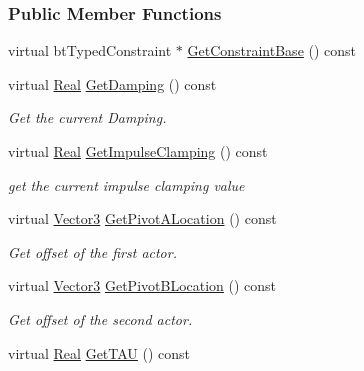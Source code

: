 \subsubsection*{Public Member Functions}
\begin{DoxyCompactItemize}
\item 
virtual btTypedConstraint $\ast$ \hyperlink{classMezzanine_1_1Point2PointConstraint_a99f25e594a55a5c84db10981c30ffd60}{GetConstraintBase} () const 
\item 
virtual \hyperlink{namespaceMezzanine_a726731b1a7df72bf3583e4a97282c6f6}{Real} \hyperlink{classMezzanine_1_1Point2PointConstraint_a5578b5727952e6c225a989d88380774e}{GetDamping} () const 
\begin{DoxyCompactList}\small\item\em Get the current Damping. \item\end{DoxyCompactList}\item 
virtual \hyperlink{namespaceMezzanine_a726731b1a7df72bf3583e4a97282c6f6}{Real} \hyperlink{classMezzanine_1_1Point2PointConstraint_aa2d314fd48f4623393d4c981f2200bcd}{GetImpulseClamping} () const 
\begin{DoxyCompactList}\small\item\em get the current impulse clamping value \item\end{DoxyCompactList}\item 
virtual \hyperlink{classMezzanine_1_1Vector3}{Vector3} \hyperlink{classMezzanine_1_1Point2PointConstraint_a975132636767ba41ef2eb277467d9bee}{GetPivotALocation} () const 
\begin{DoxyCompactList}\small\item\em Get offset of the first actor. \item\end{DoxyCompactList}\item 
virtual \hyperlink{classMezzanine_1_1Vector3}{Vector3} \hyperlink{classMezzanine_1_1Point2PointConstraint_a7d8ad35c958e6867cb7259940b803431}{GetPivotBLocation} () const 
\begin{DoxyCompactList}\small\item\em Get offset of the second actor. \item\end{DoxyCompactList}\item 
virtual \hyperlink{namespaceMezzanine_a726731b1a7df72bf3583e4a97282c6f6}{Real} \hyperlink{classMezzanine_1_1Point2PointConstraint_a2cecb3691f656ca1a9c8d57987e6c926}{GetTAU} () const 

\end{DoxyCompactItemize}
